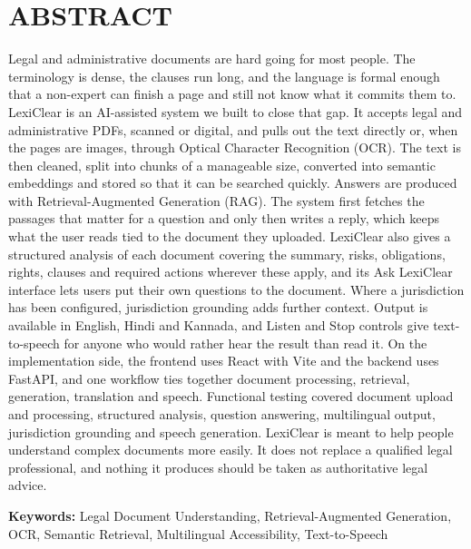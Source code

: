 \documentclass[12pt,a4paper,oneside]{report}
\renewcommand{\contentsname}{CONTENTS}
\begin{document}
\chapter*{\centering\Large\bfseries ABSTRACT}
\pagestyle{frontmatter}
Legal and administrative documents are hard going for most people. The terminology is dense, the clauses run long, and the language is formal enough that a non-expert can finish a page and still not know what it commits them to. LexiClear is an AI-assisted system we built to close that gap. It accepts legal and administrative PDFs, scanned or digital, and pulls out the text directly or, when the pages are images, through Optical Character Recognition (OCR). The text is then cleaned, split into chunks of a manageable size, converted into semantic embeddings and stored so that it can be searched quickly. Answers are produced with Retrieval-Augmented Generation (RAG). The system first fetches the passages that matter for a question and only then writes a reply, which keeps what the user reads tied to the document they uploaded. LexiClear also gives a structured analysis of each document covering the summary, risks, obligations, rights, clauses and required actions wherever these apply, and its Ask LexiClear interface lets users put their own questions to the document. Where a jurisdiction has been configured, jurisdiction grounding adds further context. Output is available in English, Hindi and Kannada, and Listen and Stop controls give text-to-speech for anyone who would rather hear the result than read it. On the implementation side, the frontend uses React with Vite and the backend uses FastAPI, and one workflow ties together document processing, retrieval, generation, translation and speech. Functional testing covered document upload and processing, structured analysis, question answering, multilingual output, jurisdiction grounding and speech generation. LexiClear is meant to help people understand complex documents more easily. It does not replace a qualified legal professional, and nothing it produces should be taken as authoritative legal advice.

\par\medskip\noindent\textbf{Keywords:} Legal Document Understanding, Retrieval-Augmented Generation, OCR, Semantic Retrieval, Multilingual Accessibility, Text-to-Speech

\clearpage




\renewcommand{\contentsname}{\centering\Large\bfseries CONTENTS}
\tableofcontents
\pagestyle{frontmatter}
\clearpage
\end{document}
